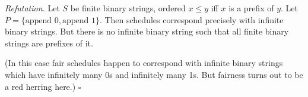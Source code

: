 \documentclass{article}
\newcommand{\N}{\mathbb{N}}
\newcommand{\todo}[1]{{\color{red}{#1}}}
\newtheorem{corollary}{Corollary}
\newenvironment{refutation}
  {\vspace{0.5em}\noindent\textit{Refutation.}}
  {\hfill$\square$\vspace{0.5em}}
\begin{document}
\begin{refutation}
  Let $S$ be finite binary strings, ordered $x \le y$ iff $x$ is a prefix of
  $y$. Let $P = \{\text{append }0, \text{append }1\}$. Then schedules correspond
  precisely with infinite binary strings. But there is no infinite binary string
  such that all finite binary strings are prefixes of it.

  (In this case fair schedules happen to correspond with infinite binary strings
  which have infinitely many 0s and infinitely many 1s. But fairness turns out
  to be a red herring here.)
\end{refutation}



\end{document}
